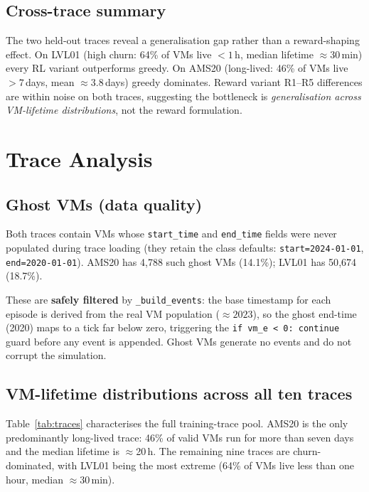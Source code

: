 \documentclass[11pt]{article}
\begin{document}
\subsection{Cross-trace summary}

The two held-out traces reveal a generalisation gap rather than a reward-shaping
effect. On LVL01 (high churn: 64\% of VMs live $<1$\,h, median lifetime
$\approx$30\,min) every RL variant outperforms greedy. On AMS20 (long-lived:
46\% of VMs live $>7$\,days, mean $\approx$3.8\,days) greedy dominates.
Reward variant R1--R5 differences are within noise on both traces,
suggesting the bottleneck is \emph{generalisation across VM-lifetime
distributions}, not the reward formulation.

\section{Trace Analysis}
\label{sec:trace-analysis}

\subsection{Ghost VMs (data quality)}

Both traces contain VMs whose \texttt{start\_time} and \texttt{end\_time}
fields were never populated during trace loading (they retain the class
defaults: \texttt{start=2024-01-01}, \texttt{end=2020-01-01}).
AMS20 has 4{,}788 such ghost VMs (14.1\%); LVL01 has 50{,}674 (18.7\%).

These are \textbf{safely filtered} by \texttt{\_build\_events}: the base
timestamp for each episode is derived from the real VM population
($\approx2023$), so the ghost end-time (2020) maps to a tick far
below zero, triggering the \texttt{if vm\_e < 0: continue} guard before
any event is appended.  Ghost VMs generate no events and do not corrupt
the simulation.

\subsection{VM-lifetime distributions across all ten traces}

Table~\ref{tab:traces} characterises the full training-trace pool.
AMS20 is the only predominantly long-lived trace: 46\% of valid VMs
run for more than seven days and the median lifetime is $\approx$20\,h.
The remaining nine traces are churn-dominated, with LVL01 being the
most extreme (64\% of VMs live less than one hour, median $\approx$30\,min).
\end{document}
